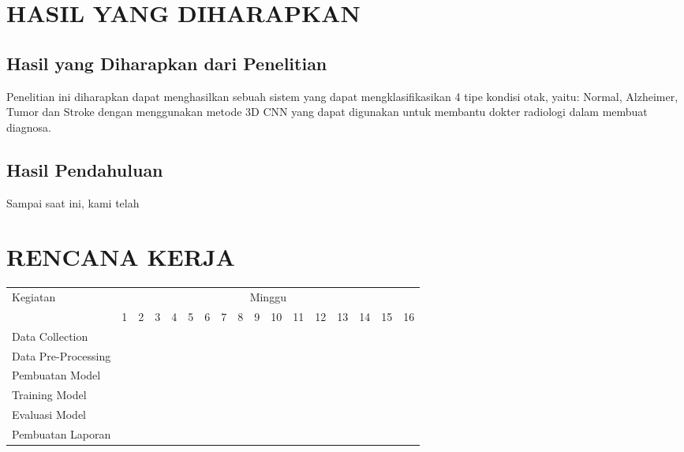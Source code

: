 \section{HASIL YANG DIHARAPKAN}

\subsection{Hasil yang Diharapkan dari Penelitian}

Penelitian ini diharapkan dapat menghasilkan sebuah sistem yang dapat mengklasifikasikan 4 tipe kondisi otak, yaitu: Normal, Alzheimer, Tumor dan Stroke dengan menggunakan metode 3D CNN yang dapat digunakan untuk membantu dokter radiologi dalam membuat diagnosa.

\subsection{Hasil Pendahuluan}

Sampai saat ini, kami telah \lipsum[16]

\section{RENCANA KERJA}

\newcommand{\w}{}
\newcommand{\G}{\cellcolor{gray}}
\begin{table}[h!]
  \begin{tabular}{|p{3.5cm}|c|c|c|c|c|c|c|c|c|c|c|c|c|c|c|c|}

    \hline
    \multirow{2}{*}{Kegiatan} & \multicolumn{16}{|c|}{Minggu} \\
    \cline{2-17} &
    1 & 2 & 3 & 4 & 5 & 6 & 7 & 8 & 9 & 10 & 11 & 12 & 13 & 14 & 15 & 16 \\
    \hline

    Data Collection &
    \G & \G & \w & \w & \w & \w & \w & \w & \w & \w & \w & \w & \w & \w & \w & \w \\
    \hline

    Data Pre-Processing &
    \w & \G & \G & \G & \w & \w & \w & \w & \w & \w & \w & \w & \w & \w & \w & \w \\
    \hline

    Pembuatan Model &
    \w & \w & \w & \w & \G & \G & \G & \G & \G & \G & \G & \G & \G & \G & \w & \w \\
    \hline

    Training Model &
    \w & \w & \w & \w & \w & \w & \G & \G & \G & \G & \G & \G & \G & \G & \w & \w \\
    \hline
    
    Evaluasi Model &
    \w & \w & \w & \w & \w & \w & \w & \G & \G & \G & \G & \G & \G & \G & \w & \w \\
    \hline
    
    Pembuatan Laporan &
    \w & \w & \w & \w & \w & \w & \w & \w & \w & \w & \w & \w & \w & \w & \G & \G \\
    \hline

  \end{tabular}
\end{table}
